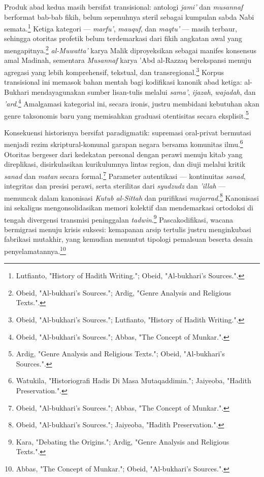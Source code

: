 Produk abad kedua masih bersifat transisional: antologi \textit{jami'} dan \textit{musannaf} berformat bab-bab fikih, belum sepenuhnya steril sebagai kumpulan sabda Nabi semata.\footnote{Lutfianto, "History of Hadith Writing."; Obeid, "Al-bukhari's Sources.".} Ketiga kategori --- \textit{marfu'}, \textit{mauquf}, dan \textit{maqtu'} --- masih terbaur, sehingga otoritas profetik belum terdemarkasi dari fikih angkatan awal yang mengapitnya.\footnote{Obeid, "Al-bukhari's Sources."; Ardig, "Genre Analysis and Religious Texts.".} \textit{al-Muwatta'} karya Malik diproyeksikan sebagai manifes konsensus amal Madinah, sementara \textit{Musannaf} karya 'Abd al-Razzaq berekspansi menuju agregasi yang lebih komprehensif, tekstual, dan transregional.\footnote{Obeid, "Al-bukhari's Sources."; Lutfianto, "History of Hadith Writing.".} Korpus transisional ini memasok bahan mentah bagi kodifikasi kanonik abad ketiga: al-Bukhari mendayagunakan sumber lisan-tulis melalui \textit{sama'}, \textit{ijazah}, \textit{wajadah}, dan \textit{'ard}.\footnote{Obeid, "Al-bukhari's Sources."; Abbas, "The Concept of Munkar.".} Amalgamasi kategorial ini, secara ironis, justru membidani kebutuhan akan genre taksonomis baru yang memisahkan graduasi otentisitas secara eksplisit.\footnote{Ardig, "Genre Analysis and Religious Texts."; Obeid, "Al-bukhari's Sources.".}

Konsekuensi historisnya bersifat paradigmatik: supremasi oral-privat bermutasi menjadi rezim skriptural-komunal garapan negara bersama komunitas ilmu.\footnote{Watukila, "Historiografi Hadis Di Masa Mutaqaddimin."; Jaiyeoba, "Hadith Preservation.".} Otoritas bergeser dari kedekatan personal dengan perawi menuju kitab yang direplikasi, disirkulasikan kurikulumnya lintas region, dan diuji melalui kritik \textit{sanad} dan \textit{matan} secara formal.\footnote{Obeid, "Al-bukhari's Sources."; Abbas, "The Concept of Munkar.".} Parameter autentikasi --- kontinuitas \textit{sanad}, integritas dan presisi perawi, serta sterilitas dari \textit{syudzudz} dan \textit{'illah} --- memuncak dalam kanonisasi \textit{Kutub al-Sittah} dan purifikasi \textit{mujarrad}.\footnote{Obeid, "Al-bukhari's Sources."; Jaiyeoba, "Hadith Preservation.".} Kanonisasi ini sekaligus mengonsolidasikan memori kolektif dan mendemarkasi ortodoksi di tengah divergensi transmisi peninggalan \textit{tadwin}.\footnote{Kara, "Debating the Origins."; Ardig, "Genre Analysis and Religious Texts.".} Pascakodifikasi, wacana bermigrasi menuju krisis suksesi: kemapanan arsip tertulis justru menginkubasi fabrikasi mutakhir, yang kemudian menuntut tipologi pemalsuan beserta desain penyelamatannya.\footnote{Abbas, "The Concept of Munkar."; Obeid, "Al-bukhari's Sources.".}


